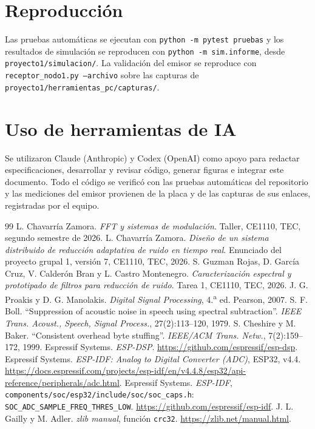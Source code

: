 \documentclass[10pt,a4paper,twocolumn]{article}
\newcommand{\ruta}[1]{\nolinkurl{#1}}
\begin{document}
\section*{Reproducción}
Las pruebas automáticas se ejecutan con \texttt{python -m pytest pruebas} y los resultados de simulación se reproducen con \texttt{python -m sim.informe}, desde \ruta{proyecto1/simulacion/}. La validación del emisor se reproduce con \texttt{receptor\_nodo1.py --archivo} sobre las capturas de \ruta{proyecto1/herramientas_pc/capturas/}.

\section*{Uso de herramientas de IA}
Se utilizaron Claude (Anthropic) y Codex (OpenAI) como apoyo para redactar especificaciones, desarrollar y revisar código, generar figuras e integrar este documento. Todo el código se verificó con las pruebas automáticas del repositorio y las mediciones del emisor provienen de la placa y de las capturas de sus enlaces, registradas por el equipo.

\begin{thebibliography}{99}\small
{} L. Chavarría Zamora. \emph{FFT y sistemas de modulación}. Taller, CE1110, TEC, segundo semestre de 2026.
 L. Chavarría Zamora. \emph{Diseño de un sistema distribuido de reducción adaptativa de ruido en tiempo real}. Enunciado del proyecto grupal 1, versión 7, CE1110, TEC, 2026.
 S. Guzman Rojas, D. García Cruz, V. Calderón Bran y L. Castro Montenegro. \emph{Caracterización espectral y prototipado de filtros para reducción de ruido}. Tarea 1, CE1110, TEC, 2026.
 J. G. Proakis y D. G. Manolakis. \emph{Digital Signal Processing}, 4.\textsuperscript{a} ed. Pearson, 2007.
 S. F. Boll. ``Suppression of acoustic noise in speech using spectral subtraction''. \emph{IEEE Trans. Acoust., Speech, Signal Process.}, 27(2):113--120, 1979.
 S. Cheshire y M. Baker. ``Consistent overhead byte stuffing''. \emph{IEEE/ACM Trans. Netw.}, 7(2):159--172, 1999.
 Espressif Systems. \emph{ESP-DSP}. \url{https://github.com/espressif/esp-dsp}.
 Espressif Systems. \emph{ESP-IDF: Analog to Digital Converter (ADC)}, ESP32, v4.4. \url{https://docs.espressif.com/projects/esp-idf/en/v4.4.8/esp32/api-reference/peripherals/adc.html}.
 Espressif Systems. \emph{ESP-IDF}, \ruta{components/soc/esp32/include/soc/soc_caps.h}: \ruta{SOC_ADC_SAMPLE_FREQ_THRES_LOW}. \url{https://github.com/espressif/esp-idf}.
 J. L. Gailly y M. Adler. \emph{zlib manual}, función \ruta{crc32}. \url{https://zlib.net/manual.html}.
\end{thebibliography}
\onecolumn
\appendix
\end{document}

